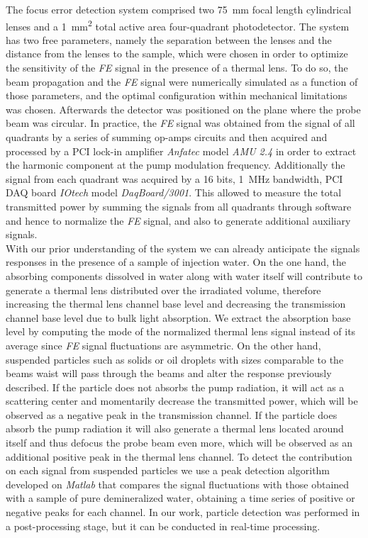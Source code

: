 \documentclass[9pt,twocolumn,twoside]{osajnl}
\newcommand{\FE}{\textit{FE}}
\begin{document}
The focus error detection system comprised two \SI{75}{\milli\metre} focal length cylindrical lenses and a \SI{1}{\milli\metre^2} total active area four-quadrant photodetector. The system has two free parameters, namely the separation between the lenses and the distance from the lenses to the sample, which were chosen in order to optimize the sensitivity of the \FE{} signal in the presence of a thermal lens. To do so, the beam propagation and the \FE{} signal were numerically simulated as a function of those parameters, and the optimal configuration within mechanical limitations was chosen. Afterwards the detector was positioned on the plane where the probe beam was circular. In practice, the \FE{} signal was obtained from the signal of all quadrants by a series of summing op-amps circuits and then acquired and processed by a PCI lock-in amplifier \emph{Anfatec} model \emph{AMU 2.4} in order to extract the harmonic component at the pump modulation frequency. Additionally the signal from each quadrant was acquired by a 16 bits, \SI{1}{\mega\hertz} bandwidth, PCI DAQ board \emph{IOtech} model \emph{DaqBoard/3001}. This allowed to measure the total transmitted power by summing the signals from all quadrants through software and hence to normalize the \FE{} signal, and also to generate additional auxiliary signals. \\

With our prior understanding of the system we can already anticipate the signals responses in the presence of a sample of injection water. On the one hand, the absorbing components dissolved in water along with water itself will contribute to generate a thermal lens distributed over the irradiated volume, therefore increasing the thermal lens channel base level and decreasing the transmission channel base level due to bulk light absorption. We extract the absorption base level by computing the mode of the normalized thermal lens signal instead of its average since \FE{} signal fluctuations are asymmetric. On the other hand, suspended particles such as solids or oil droplets with sizes comparable to the beams waist will pass through the beams and alter the response previously described. If the particle does not absorbs the pump radiation, it will act as a scattering center and momentarily decrease the transmitted power, which will be observed as a negative peak in the transmission channel. If the particle does absorb the pump radiation it will also generate a thermal lens located around itself and thus defocus the probe beam even more, which will be observed as an additional positive peak in the thermal lens channel. To detect the contribution on each signal from suspended particles we use a peak detection algorithm developed on \emph{Matlab} that compares the signal fluctuations with those obtained with a sample of pure demineralized water, obtaining a time series of positive or negative peaks for each channel. In our work, particle detection was performed in a post-processing stage, but it can be conducted in real-time processing.
\end{document}
